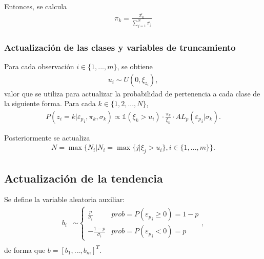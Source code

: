 Entonces, se calcula
\begin{equation*}
\begin{aligned}
    \pi_k = \frac{\bar{\pi_k}}{\sum_{j=1}^N \bar{\pi_j}}
\end{aligned}
\end{equation*}

\subsubsection{Actualizaci\'on de las clases y variables de truncamiento}

Para cada observaci\'on $i \in \{1,...,m\}$, se obtiene
\begin{equation*}
\begin{aligned}
   u_i \sim U(0, \xi_{z_i}),
\end{aligned}
\end{equation*}
valor que se utiliza para actualizar la probabilidad de pertenencia a cada clase de la siguiente forma. Para cada $k \in \{1,2,...,N\}$,
\begin{equation*}
\begin{aligned}
   P(z_i = k| {\varepsilon_p}_i, \pi_k, \sigma_k)
   \propto
   \mathds{1}(\xi_k > u_i)
   \cdot
   \frac{\pi_k}{\xi_k}
   \cdot
   AL_p({\varepsilon_p}_i | \sigma_k).
\end{aligned}
\end{equation*}

Posteriormente se actualiza
\begin{equation*}
\begin{aligned}
   N = \max\{
    N_i|N_i=\max\{j|\xi_j > u_i\}, 
    i \in \{1,...,m\}
   \}.
\end{aligned}
\end{equation*}

\subsection{Actualizaci\'on de la tendencia}

Se define la variable aleatoria auxiliar:
\begin{equation*}
\begin{aligned}
    b_i &\sim 
    \begin{cases}
        \frac{p}{\sigma_i} &prob = P({\varepsilon_p}_i \geq 0) = 1-p\\
        -\frac{1-p}{\sigma_i} &prob = P({\varepsilon_p}_i < 0) = p
    \end{cases},\\
\end{aligned}
\end{equation*}
de forma que $b = [b_1,...,b_m]^T$. 


